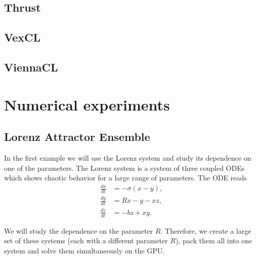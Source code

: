 \documentclass[1p]{elsarticle}
\begin{document}
\subsection{Thrust}
\subsection{VexCL}
\subsection{ViennaCL}

\section{Numerical experiments}

\subsection{Lorenz Attractor Ensemble}

In the first example we will use the Lorenz system and study its dependence on
one of the parameters. The Lorenz system is a system of three coupled ODEs
which shows chaotic behavior for a large range of parameters. The ODE reads
\begin{align}
    \frac{dx}{dt} &= -\sigma \left( x - y \right), \\
    \frac{dy}{dt} &= R x - y - xz, \\
    \frac{dz}{dt} &= -bz + xy.
\end{align}

We will study the dependence on the parameter $R$. Therefore, we create a large
set of these systems (each with a different parameter $R$), pack them all into
one system and solve them simultaneously on the GPU.
\end{document}

